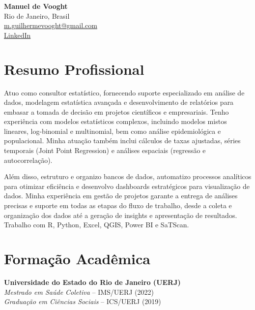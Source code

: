 \documentclass[a4paper,12pt]{article}
\begin{document}
\begin{center}
    {\LARGE \textbf{Manuel de Vooght}} \\
    Rio de Janeiro, Brasil \\
    \href{mailto:m.guilhermevooght@gmail.com}{m.guilhermevooght@gmail.com} \\
    \href{https://www.linkedin.com/in/mvooght}{\color{blue}\faLinkedin \space LinkedIn}
\end{center}

\vspace{1em}

\section*{Resumo Profissional}
Atuo como consultor estatístico, fornecendo suporte especializado em análise de dados, modelagem estatística avançada e desenvolvimento de relatórios para embasar a tomada de decisão em projetos científicos e empresariais. Tenho experiência com modelos estatísticos complexos, incluindo modelos mistos lineares, log-binomial e multinomial, bem como análise epidemiológica e populacional. Minha atuação também inclui cálculos de taxas ajustadas, séries temporais (Joint Point Regression) e análises espaciais (regressão e autocorrelação).

Além disso, estruturo e organizo bancos de dados, automatizo processos analíticos para otimizar eficiência e desenvolvo dashboards estratégicos para visualização de dados. Minha experiência em gestão de projetos garante a entrega de análises precisas e suporte em todas as etapas do fluxo de trabalho, desde a coleta e organização dos dados até a geração de insights e apresentação de resultados. Trabalho com R, Python, Excel, QGIS, Power BI e SaTScan.

\vspace{0.6em}

\section*{Formação Acadêmica}
\textbf{Universidade do Estado do Rio de Janeiro (UERJ)} \\
\textit{Mestrado em Saúde Coletiva} – IMS/UERJ (2022) \\
\textit{Graduação em Ciências Sociais} – ICS/UERJ (2019)

\vspace{0.6em}
\end{document}
